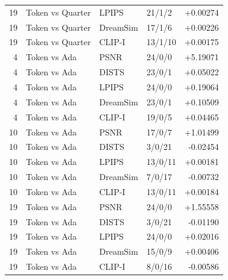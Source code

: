 \documentclass[10pt,letterpaper]{article}
\begin{document}
\begin{longtable}{@{}rlllr@{}}
19 & Token vs Quarter & LPIPS & 21/1/2 & +0.00274\\
19 & Token vs Quarter & DreamSim & 17/1/6 & +0.00226\\
19 & Token vs Quarter & CLIP-I & 13/1/10 & +0.00175\\
4 & Token vs Ada & PSNR & 24/0/0 & +5.19071\\
4 & Token vs Ada & DISTS & 23/0/1 & +0.05022\\
4 & Token vs Ada & LPIPS & 24/0/0 & +0.19064\\
4 & Token vs Ada & DreamSim & 23/0/1 & +0.10509\\
4 & Token vs Ada & CLIP-I & 19/0/5 & +0.04465\\
10 & Token vs Ada & PSNR & 17/0/7 & +1.01499\\
10 & Token vs Ada & DISTS & 3/0/21 & -0.02454\\
10 & Token vs Ada & LPIPS & 13/0/11 & +0.00181\\
10 & Token vs Ada & DreamSim & 7/0/17 & -0.00732\\
10 & Token vs Ada & CLIP-I & 13/0/11 & +0.00184\\
19 & Token vs Ada & PSNR & 24/0/0 & +1.55558\\
19 & Token vs Ada & DISTS & 3/0/21 & -0.01190\\
19 & Token vs Ada & LPIPS & 24/0/0 & +0.02016\\
19 & Token vs Ada & DreamSim & 15/0/9 & +0.00406\\
19 & Token vs Ada & CLIP-I & 8/0/16 & -0.00586\\
\bottomrule\end{longtable}
\end{document}
